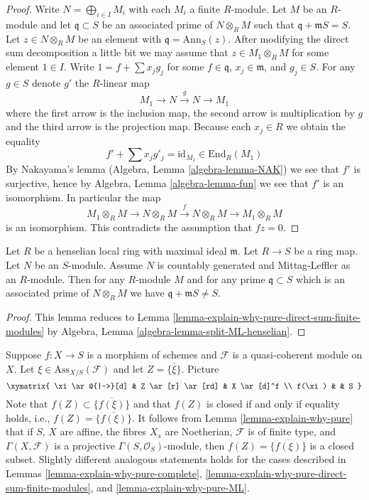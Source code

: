 \begin{proof}
Write $N = \bigoplus_{i \in I} M_i$ with each $M_i$ a finite $R$-module.
Let $M$ be an $R$-module and let $\mathfrak q \subset S$ be an associated
prime of $N \otimes_R M$ such that $\mathfrak q + \mathfrak m S = S$. Let
$z \in N \otimes_R M$ be an element with $\mathfrak q = \text{Ann}_S(z)$.
After modifying the direct sum decomposition a little bit we may assume that
$z \in M_1 \otimes_R M$ for some element $1 \in I$. Write
$1 = f + \sum x_j g_j$ for some $f \in \mathfrak q$, $x_j \in \mathfrak m$,
and $g_j \in S$. For any $g \in S$ denote $g'$ the $R$-linear map
$$
M_1 \to N \xrightarrow{g} N \to M_1
$$
where the first arrow is the inclusion map, the second arrow is multiplication
by $g$ and the third arrow is the projection map. Because each $x_j \in R$
we obtain the equality
$$
f' + \sum x_j g'_j = \text{id}_{M_1} \in \text{End}_R(M_1)
$$
By Nakayama's lemma
(Algebra, Lemma \ref{algebra-lemma-NAK})
we see that $f'$ is surjective, hence by
Algebra, Lemma \ref{algebra-lemma-fun}
we see that $f'$ is an isomorphism. In particular the map
$$
M_1 \otimes_R M \to N \otimes_R M \xrightarrow{f} N \otimes_R M
\to M_1 \otimes_R M
$$
is an isomorphism. This contradicts the assumption that $fz = 0$.
\end{proof}

\begin{lemma}
\label{lemma-explain-why-pure-ML}
Let $R$ be a henselian local ring with maximal ideal $\mathfrak m$.
Let $R \to S$ be a ring map. Let $N$ be an $S$-module.
Assume $N$ is countably generated and Mittag-Leffler as an $R$-module.
Then for any $R$-module $M$ and for any prime $\mathfrak q \subset S$
which is an associated prime of $N \otimes_R M$ we have
$\mathfrak q + \mathfrak m S \not = S$.
\end{lemma}

\begin{proof}
This lemma reduces to
Lemma \ref{lemma-explain-why-pure-direct-sum-finite-modules}
by
Algebra, Lemma \ref{algebra-lemma-split-ML-henselian}.
\end{proof}

\noindent
Suppose $f : X \to S$ is a morphism of schemes and
$\mathcal{F}$ is a quasi-coherent module on $X$.
Let $\xi \in \text{Ass}_{X/S}(\mathcal{F})$ and let $Z = \overline{\{\xi\}}$.
Picture
$$
\xymatrix{
\xi \ar@{|->}[d] & Z \ar[r] \ar[rd] & X \ar[d]^f \\
f(\xi) & & S
}
$$
Note that $f(Z) \subset \overline{\{f(\xi)\}}$ and that $f(Z)$ is closed
if and only if equality holds, i.e., $f(Z) = \overline{\{f(\xi)\}}$.
It follows from
Lemma \ref{lemma-explain-why-pure}
that if $S$, $X$ are affine, the fibres $X_s$ are Noetherian,
$\mathcal{F}$ is of finite type, and $\Gamma(X, \mathcal{F})$
is a projective $\Gamma(S, \mathcal{O}_S)$-module, then
$f(Z) = \overline{\{f(\xi)\}}$ is a closed subset.
Slightly different analogous statements holds for the cases described in
Lemmas \ref{lemma-explain-why-pure-complete},
\ref{lemma-explain-why-pure-direct-sum-finite-modules}, and
\ref{lemma-explain-why-pure-ML}.




